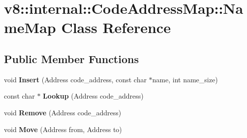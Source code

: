 \hypertarget{classv8_1_1internal_1_1_code_address_map_1_1_name_map}{}\section{v8\+:\+:internal\+:\+:Code\+Address\+Map\+:\+:Name\+Map Class Reference}
\label{classv8_1_1internal_1_1_code_address_map_1_1_name_map}
\subsection*{Public Member Functions}
\begin{DoxyCompactItemize}
\item 
void {\bfseries Insert} (Address code\+\_\+address, const char $\ast$name, int name\+\_\+size)\hypertarget{classv8_1_1internal_1_1_code_address_map_1_1_name_map_a4bb8d87440b4190c6b5cc7975c2823fa}{}\label{classv8_1_1internal_1_1_code_address_map_1_1_name_map_a4bb8d87440b4190c6b5cc7975c2823fa}

\item 
const char $\ast$ {\bfseries Lookup} (Address code\+\_\+address)\hypertarget{classv8_1_1internal_1_1_code_address_map_1_1_name_map_a1b8583f32c501a2c7728ee43289b9d92}{}\label{classv8_1_1internal_1_1_code_address_map_1_1_name_map_a1b8583f32c501a2c7728ee43289b9d92}

\item 
void {\bfseries Remove} (Address code\+\_\+address)\hypertarget{classv8_1_1internal_1_1_code_address_map_1_1_name_map_ac626af84f0ef0b443a6c7ddf47d1daf3}{}\label{classv8_1_1internal_1_1_code_address_map_1_1_name_map_ac626af84f0ef0b443a6c7ddf47d1daf3}

\item 
void {\bfseries Move} (Address from, Address to)\hypertarget{classv8_1_1internal_1_1_code_address_map_1_1_name_map_a336f2df1166c61c59ae9fa7303463edd}{}\label{classv8_1_1internal_1_1_code_address_map_1_1_name_map_a336f2df1166c61c59ae9fa7303463edd}

\end{DoxyCompactItemize}
